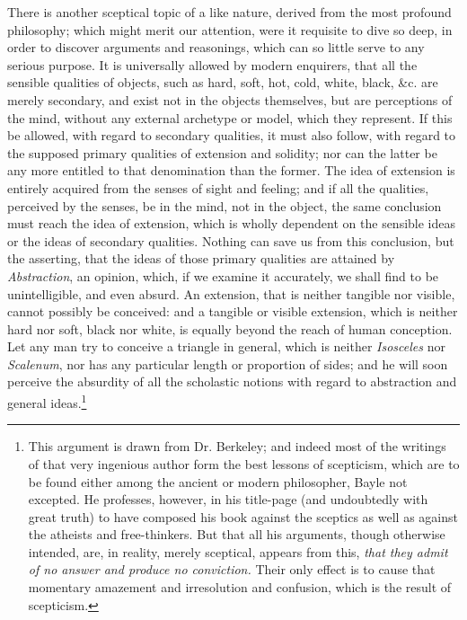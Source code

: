 \documentclass[]{article}
\newcounter{authornote}[page]
\newcommand*{\authornote}[1]{\renewcommand{\thefootnote}{\fnsymbol{footnote}}\stepcounter{authornote}\footnote[\value{authornote}]{#1}\renewcommand{\thefootnote}{\arabic{footnote}}}
\begin{document}
\begin{sectionbody}
\humeparagraph  There is another sceptical topic of a like nature, derived from the most profound philosophy; which might merit our attention, were it requisite to dive so deep, in order to discover arguments and reasonings, which can so little serve to any serious purpose. It is universally allowed by modern enquirers, that all the sensible qualities of objects, such as hard, soft, hot, cold, white, black, \&c. are merely secondary, and exist not in the objects themselves, but are perceptions of the mind, without any external archetype or model, which they represent. If this be allowed, with regard to secondary qualities, it must also follow, with regard to the supposed primary qualities of extension and solidity; nor can the latter be any more entitled to that denomination than the former. The idea of extension is entirely acquired from the senses of sight and feeling; and if all the qualities, perceived by the senses, be in the mind, not in the object, the same conclusion must reach the idea of extension, which is wholly dependent on the sensible ideas or the ideas of secondary qualities. Nothing can save us from this conclusion, but the asserting, that the ideas of those primary qualities are attained by \emph{Abstraction}, an opinion, which, if we examine it accurately, we shall find to be unintelligible, and even absurd. An extension, that is neither tangible nor visible, cannot possibly be conceived: and a tangible or visible extension, which is neither hard nor soft, black nor white, is equally beyond the reach of human conception. Let any man try to conceive a triangle in general, which is neither \emph{Isosceles} nor \emph{Scalenum}, nor has any particular length or proportion of sides; and he will soon perceive the absurdity of all the scholastic notions with regard to abstraction and general ideas.\authornote{This argument is drawn from Dr. Berkeley; and indeed most of the writings of that very ingenious author form the best lessons of scepticism, which are to be found either among the ancient or modern philosopher, Bayle not excepted. He professes, however, in his title-page (and undoubtedly with great truth) to have composed his book against the sceptics as well as against the atheists and free-thinkers. But that all his arguments, though otherwise intended, are, in reality, merely sceptical, appears from this, \emph{that they admit of no answer and produce no conviction.} Their only effect is to cause that momentary amazement and irresolution and confusion, which is the result of scepticism.}


\end{sectionbody}
\end{document}
